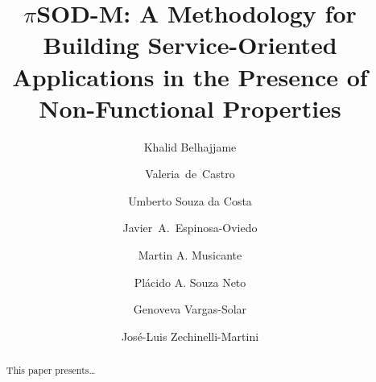 \documentclass[preprint,12pt]{elsarticle}
\begin{document}
\begin{frontmatter}



\title{$\pi$SOD-M: A Methodology for Building Service-Oriented Applications in
the Presence of Non-Functional Properties}


\author[inst1]{Khalid Belhajjame} 
\author[inst2]{Valeria~de~Castro}
\author[inst3]{Umberto Souza da Costa}
\author[inst4]{Javier~A.~Espinosa-Oviedo}
\author[inst3]{Martin A. Musicante}
\author[inst5]{Pl\'acido A. Souza Neto}
\author[inst6,inst4]{Genoveva Vargas-Solar}
\author[inst4]{Jos\'e-Luis Zechinelli-Martini}

\address[inst1]{Universi\'e de Paris - Dauphine -- Paris, France}
\address[inst2]{Universidad Rey Juan Carlos -- M\'{o}stoles, Spain}
\address[inst3]{Federal University of Rio Grande do Norte -- Natal, Brazil}
\address[inst4]{Universidad de las Am\'ericas-Puebla, LAFMIA -- Cholula, Mexico}
\address[inst5]{Federal Technological Institute of Rio Grande do Norte -- Natal, Brazil}
\address[inst6]{CNRS, LIG-LAFMIA, Saint Martin d'H\`eres, France}


\begin{abstract}
This paper presents\ldots
\end{abstract}

\begin{keyword}


\end{keyword}

\end{frontmatter}
\end{document}
